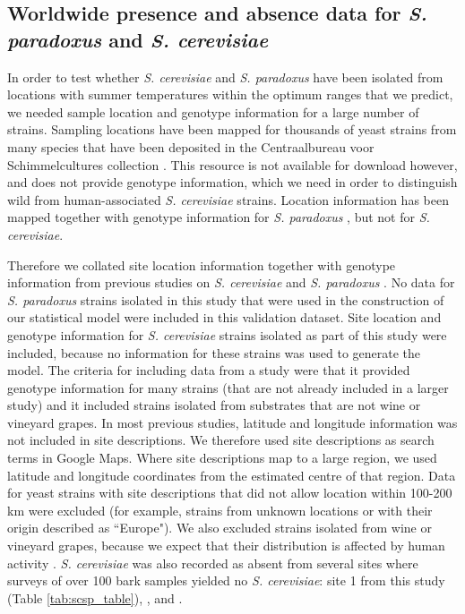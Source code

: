 \documentclass[12pt]{article}
\begin{document}
\begin{linenumbers}
\subsection*{Worldwide presence and absence data for \textit{S. paradoxus} and \textit{S. cerevisiae}}

In order to test whether \textit{S. cerevisiae} and \textit{S. paradoxus} have been isolated from locations with summer temperatures within the optimum ranges that we predict, we needed sample location and genotype information for a large number of strains. Sampling locations have been mapped for thousands of yeast strains from many species that have been deposited in the Centraalbureau voor Schimmelcultures collection \citep{robert_yeast_2006,kurtzman_advances_2015}. This resource is not available for download however, and does not provide genotype information, which we need in order to distinguish wild from human-associated \textit{S. cerevisiae} strains. Location information has been mapped together with genotype information for \textit{S. paradoxus} \citep{boynton_ecology_2014}, but not for \textit{S. cerevisiae}. 

Therefore we collated site location information together with genotype information from previous studies on \textit{S. cerevisiae} \citep{zhang_saccharomyces_2010,wang_surprisingly_2012,cromie_genomic_2013,almeida_population_2015} and \textit{S. paradoxus} \citep{naumov_differentiation_1997,kuehne_allopatric_2007,liti_population_2009,zhang_saccharomyces_2010,leducq_local_2014}. No data for \textit{S. paradoxus} strains isolated in this study that were used in the construction of our statistical model were included in this validation dataset. Site location and genotype information for \textit{S. cerevisiae} strains isolated as part of this study were included, because no information for these strains was used to generate the model. The criteria for including data from a study were that it provided genotype information for many strains (that are not already included in a larger study) and it included strains isolated from substrates that are not wine or vineyard grapes. In most previous studies, latitude and longitude information was not included in site descriptions. We therefore used site descriptions as search terms in Google Maps. Where site descriptions map to a large region, we used latitude and longitude coordinates from the estimated centre of that region. Data for yeast strains with site descriptions that did not allow location within 100-200 km were excluded (for example, strains from unknown locations or with their origin described as ``Europe"). We also excluded strains isolated from wine or vineyard grapes, because we expect that their distribution is affected by human activity \citep{fay_evidence_2005}. \textit{S. cerevisiae} was also recorded as absent from several sites where surveys of over 100 bark samples yielded no \textit{S. cerevisiae}: site 1 from this study (Table \ref{tab:scsp_table}), \citet{charron_exploring_2014}, \citet{johnson_population_2004} and \citet{kowallik_interaction_2015}. 


\end{linenumbers}
\end{document}
